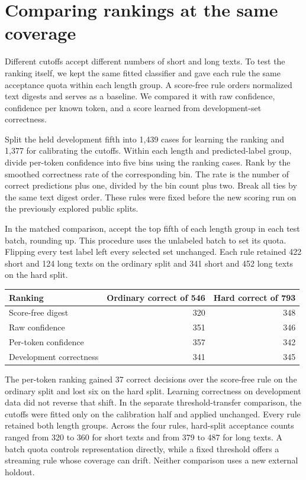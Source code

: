\documentclass[11pt]{article}
\begin{document}
\section{Comparing rankings at the same coverage}
Different cutoffs accept different numbers of short and long
texts. To test the ranking itself, we kept the same fitted
classifier and gave each rule the same acceptance quota within
each length group. A score-free rule orders normalized text
digests and serves as a baseline. We compared it with raw
confidence, confidence per known token, and a score learned
from development-set correctness.

Split the held development fifth into 1,439 cases for learning
the ranking and 1,377 for calibrating the cutoffs. Within each
length and predicted-label group, divide per-token confidence
into five bins using the ranking cases. Rank by the smoothed
correctness rate of the corresponding bin. The rate is the
number of correct predictions plus one, divided by the bin count
plus two. Break all ties by the same text digest order. These
rules were fixed before the new scoring run on the previously
explored public splits.

In the matched comparison, accept the top fifth of each length
group in each test batch, rounding up. This procedure uses the
unlabeled batch to set its quota. Flipping every test label
left every selected set unchanged. Each rule retained 422 short
and 124 long texts on the ordinary split and 341 short and
452 long texts on the hard split.
\begin{center}
\small
\begin{tabular}{lrr}
\toprule
Ranking & Ordinary correct of 546 & Hard correct of 793 \\
\midrule
Score-free digest & 320 & 348 \\
Raw confidence & 351 & 346 \\
Per-token confidence & 357 & 342 \\
Development correctness & 341 & 345 \\
\bottomrule
\end{tabular}
\end{center}

The per-token ranking gained 37 correct decisions over the
score-free rule on the ordinary split and lost six on the hard
split. Learning correctness on development data did not reverse
that shift. In the separate threshold-transfer comparison, the
cutoffs were fitted only on the calibration half and applied
unchanged. Every rule retained both length groups. Across the
four rules, hard-split acceptance counts ranged from 320 to 360
for short texts and from 379 to 487 for long texts. A batch quota
controls representation directly, while a fixed threshold offers
a streaming rule whose coverage can drift. Neither comparison
uses a new external holdout.
\end{document}
